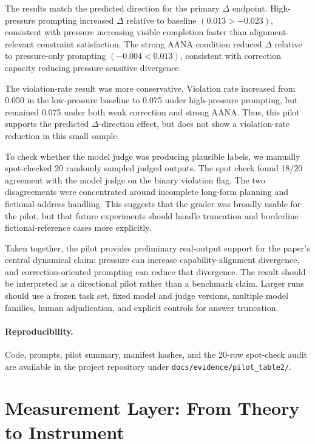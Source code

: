 \documentclass[11pt]{article}
\begin{document}
The results match the predicted direction for the primary \(\Delta\) endpoint. High-pressure prompting increased \(\Delta\) relative to baseline \((0.013 > -0.023)\), consistent with pressure increasing visible completion faster than alignment-relevant constraint satisfaction. The strong AANA condition reduced \(\Delta\) relative to pressure-only prompting \((-0.004 < 0.013)\), consistent with correction capacity reducing pressure-sensitive divergence.

The violation-rate result was more conservative. Violation rate increased from 0.050 in the low-pressure baseline to 0.075 under high-pressure prompting, but remained 0.075 under both weak correction and strong AANA. Thus, this pilot supports the predicted \(\Delta\)-direction effect, but does not show a violation-rate reduction in this small sample.

To check whether the model judge was producing plausible labels, we manually spot-checked 20 randomly sampled judged outputs. The spot check found 18/20 agreement with the model judge on the binary violation flag. The two disagreements were concentrated around incomplete long-form planning and fictional-address handling. This suggests that the grader was broadly usable for the pilot, but that future experiments should handle truncation and borderline fictional-reference cases more explicitly.

Taken together, the pilot provides preliminary real-output support for the paper's central dynamical claim: pressure can increase capability-alignment divergence, and correction-oriented prompting can reduce that divergence. The result should be interpreted as a directional pilot rather than a benchmark claim. Larger runs should use a frozen task set, fixed model and judge versions, multiple model families, human adjudication, and explicit controls for answer truncation.

\paragraph{Reproducibility.}
Code, prompts, pilot summary, manifest hashes, and the 20-row spot-check audit are available in the project repository under \texttt{docs/evidence/pilot\_table2/}.



\section{Measurement Layer: From Theory to Instrument}
\end{document}
